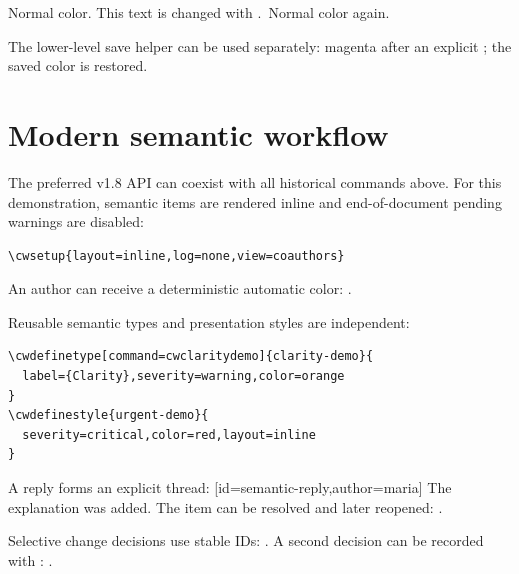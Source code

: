 \documentclass[11pt]{article}
\begin{document}
Normal color. This text is changed with
\texttt{\string\cwcolor}.\cwrestorecolor\ Normal color again.

The lower-level save helper can be used separately:
\cwsavecolor
\color{magenta}magenta after an explicit \texttt{\string\color};
\cwrestorecolor
the saved color is restored.


\section{Modern semantic workflow}

The preferred v1.8 API can coexist with all historical commands above.
For this demonstration, semantic items are rendered inline and end-of-document
pending warnings are disabled:

\begin{verbatim}
\cwsetup{layout=inline,log=none,view=coauthors}
\end{verbatim}


An author can receive a deterministic automatic color:
.

Reusable semantic types and presentation styles are independent:

\begin{verbatim}
\cwdefinetype[command=cwclaritydemo]{clarity-demo}{
  label={Clarity},severity=warning,color=orange
}
\cwdefinestyle{urgent-demo}{
  severity=critical,color=red,layout=inline
}
\end{verbatim}




A reply forms an explicit thread:
[id=semantic-reply,author=maria]
        {The explanation was added.}
The item can be resolved and later reopened:
.

Selective change decisions use stable IDs:
.
A second decision can be recorded with :
.
\end{document}
